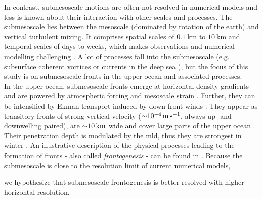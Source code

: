 In contrast, submesoscale motions are often not resolved in numerical models and less is known about their interaction with other scales and processes. The submesoscale lies between the mesoscale (dominated by rotation of the earth) and vertical turbulent mixing. It comprises spatial scales of $\SI{0.1}{\kilo\metre}$ to $\SI{10}{\kilo\metre}$ and temporal scales of days to weeks, which makes observations and numerical modelling challenging \autocite{thomas-2008-subm}. A lot of processes fall into the submesoscale (e.g. subsurface coherent vortices \autocite{mcwilliams-1985-scv} or currents in the deep sea \autocite{vic-2018-dispersion-deep-sea}), but the focus of this study is on submesoscale fronts in the upper ocean and associated processes.\\
In the upper ocean, submesoscale fronts emerge at horizontal density gradients and are powered by atmospheric forcing and mesoscale strain \autocite{thomas-2008-subm}. Further, they can be intensified by Ekman transport induced by down-front winds \autocite{thomas-2005-downfront-wind}. They appear as transitory fronts of strong vertical velocity (${\sim} \SI{e-4}{\metre\per\second}$, always up- and downwelling paired), are ${\sim} \SI{10}{\kilo\metre}$ wide and cover large parts of the upper ocean \autocite{capet-2008-fronts2}. Their penetration depth is modulated by the \ac{mld}, thus they are strongest in winter \autocite{mensa-2013-seasonality-mli, callies-2015-seasonality-subm}. An illustrative description of the physical processes leading to the formation of fronts - also called \textit{frontogenesis} - can be found in \textcite{mahadevan-2016-subm-review}. Because the submesoscale is close to the resolution limit of current numerical models,

\begin{hypothesis}
we hypothesize that submesoscale frontogenesis is better resolved with higher horizontal resolution.\label{hypo:h1}
\end{hypothesis}

